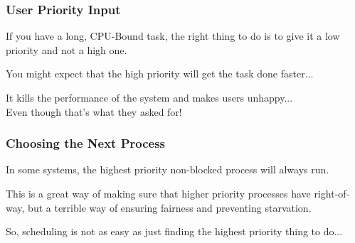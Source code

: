 \begin{frame}
\frametitle{User Priority Input}

If you have a long, CPU-Bound task, the right thing to do is to give it a low priority and not a high one. 

You might expect that the high priority will get the task done faster... 

It kills the performance of the system and makes users unhappy...\\
\quad Even though that's what they asked for!



\end{frame}

\begin{frame}
\frametitle{Choosing the Next Process}

In some systems, the highest priority non-blocked process will always run. 

This is a great way of making sure that higher priority processes have right-of-way, but a terrible way of ensuring fairness and preventing starvation. 

So, scheduling is not as easy as just finding the highest priority thing to do...

\end{frame}




